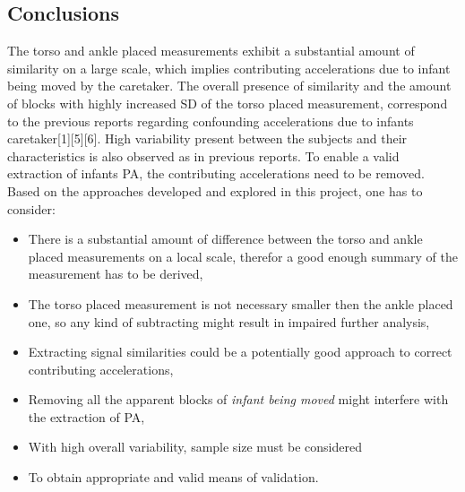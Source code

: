 \documentclass{article}
\begin{document}
{\subsection{Conclusions}
The torso and ankle placed measurements exhibit a substantial amount of similarity on a large scale, which implies contributing accelerations due to infant being moved by the caretaker. The overall presence of similarity and the amount of blocks with highly increased SD of the torso placed measurement, correspond to the previous reports regarding confounding accelerations due to infants caretaker[1][5][6]. High variability present between the subjects and their characteristics is also observed as in previous reports. To enable a valid extraction of infants PA, the contributing accelerations need to be removed. Based on the approaches developed and explored in this project, one has to consider:
\begin{itemize}
\item There is a substantial amount of difference between the torso and ankle placed measurements on a local scale, therefor a good enough summary of the measurement has to be derived,
\item The torso placed measurement is not necessary smaller then the ankle placed one, so any kind of subtracting might result in impaired further analysis,
\item Extracting signal similarities could be a potentially good approach to correct contributing accelerations,
\item Removing all the apparent blocks of \textit{infant being moved} might interfere with the extraction of PA,
\item With high overall variability, sample size must be considered
\item To obtain appropriate and valid means of validation.
\end{itemize}

}
\newpage
\end{document}
